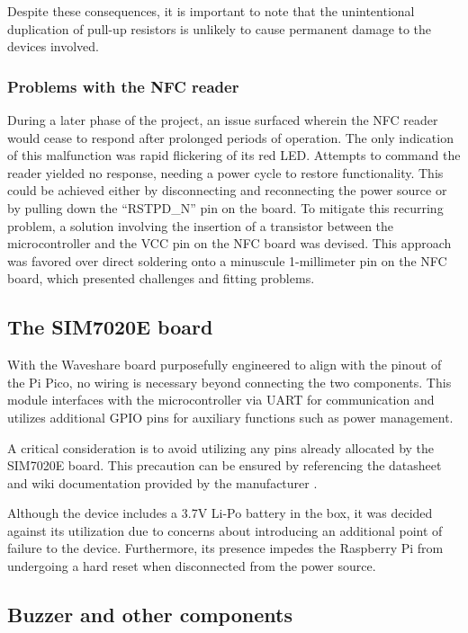 Despite these consequences, it is important to note that the unintentional duplication of pull-up resistors is unlikely to 
cause permanent damage to the devices involved.

\subsubsection*{Problems with the NFC reader}

During a later phase of the project, an issue surfaced wherein the NFC reader would cease to respond after prolonged periods 
of operation. The only indication of this malfunction was rapid flickering of its red LED. Attempts to command the reader 
yielded no response, needing a power cycle to restore functionality. This could be achieved either by disconnecting and 
reconnecting the power source or by pulling down the ``RSTPD\_N'' pin on the board. To mitigate this recurring problem, a 
solution involving the insertion of a transistor between the microcontroller and the VCC pin on the NFC board was devised. 
This approach was favored over direct soldering onto a minuscule 1-millimeter pin on the NFC board, which presented 
challenges and fitting problems.


\subsection{The SIM7020E board}

With the Waveshare board purposefully engineered to align with the pinout of the Pi Pico, no wiring is necessary beyond 
connecting the two components. This module interfaces with the microcontroller via UART for communication and utilizes 
additional GPIO pins for auxiliary functions such as power management.

A critical consideration is to avoid utilizing any pins already allocated by the SIM7020E board. This precaution can be 
ensured by referencing the datasheet and wiki documentation provided by the manufacturer \cite{sim7020e_wiki}.

Although the device includes a 3.7V Li-Po battery in the box, it was decided against its utilization due to concerns about 
introducing an additional point of failure to the device. Furthermore, its presence impedes the Raspberry Pi from undergoing 
a hard reset when disconnected from the power source.


\subsection{Buzzer and other components}

